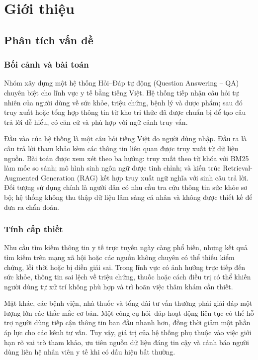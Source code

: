 \documentclass[12pt,a4paper,oneside]{report}
\begin{document}
\clearpage
{}

\chapter{Giới thiệu}
\label{chap:introduction}

\section{Phân tích vấn đề}
\subsection{Bối cảnh và bài toán}
Nhóm xây dựng một hệ thống Hỏi--Đáp tự động (Question Answering -- QA) chuyên biệt cho lĩnh vực y tế bằng tiếng Việt. Hệ thống tiếp nhận câu hỏi tự nhiên của người dùng về sức khỏe, triệu chứng, bệnh lý và dược phẩm; sau đó truy xuất hoặc tổng hợp thông tin từ kho tri thức đã được chuẩn bị để tạo câu trả lời dễ hiểu, có căn cứ và phù hợp với ngữ cảnh truy vấn.

Đầu vào của hệ thống là một câu hỏi tiếng Việt do người dùng nhập. Đầu ra là câu trả lời tham khảo kèm các thông tin liên quan được truy xuất từ dữ liệu nguồn. Bài toán được xem xét theo ba hướng: truy xuất theo từ khóa với BM25 làm mốc so sánh; mô hình sinh ngôn ngữ được tinh chỉnh; và kiến trúc Retrieval-Augmented Generation (RAG) kết hợp truy xuất ngữ nghĩa với sinh câu trả lời. Đối tượng sử dụng chính là người dân có nhu cầu tra cứu thông tin sức khỏe sơ bộ; hệ thống không thu thập dữ liệu lâm sàng cá nhân và không được thiết kế để đưa ra chẩn đoán.

\subsection{Tính cấp thiết}
Nhu cầu tìm kiếm thông tin y tế trực tuyến ngày càng phổ biến, nhưng kết quả tìm kiếm trên mạng xã hội hoặc các nguồn không chuyên có thể thiếu kiểm chứng, lỗi thời hoặc bị diễn giải sai. Trong lĩnh vực có ảnh hưởng trực tiếp đến sức khỏe, thông tin sai lệch về triệu chứng, thuốc hoặc cách điều trị có thể khiến người dùng tự xử trí không phù hợp và trì hoãn việc thăm khám cần thiết.

Mặt khác, các bệnh viện, nhà thuốc và tổng đài tư vấn thường phải giải đáp một lượng lớn các thắc mắc cơ bản. Một công cụ hỏi--đáp hoạt động liên tục có thể hỗ trợ người dùng tiếp cận thông tin ban đầu nhanh hơn, đồng thời giảm một phần áp lực cho các kênh tư vấn. Tuy vậy, giá trị của hệ thống phụ thuộc vào việc giới hạn rõ vai trò tham khảo, ưu tiên nguồn dữ liệu đáng tin cậy và cảnh báo người dùng liên hệ nhân viên y tế khi có dấu hiệu bất thường.
\end{document}
